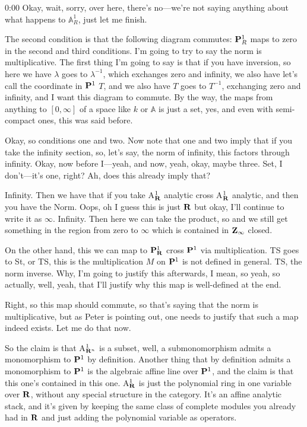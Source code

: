 \begin{unfinished}{0:00}
Okay, wait, sorry, over here, there's no---we're not saying anything about what happens to $\mathbb{A}^1_R$, just let me finish.

The second condition is that the following diagram commutes: $\P^1_R$ maps to zero in the second and third conditions. I'm going to try to say the norm is multiplicative. The first thing I'm going to say is that if you have inversion, so here we have $\lambda$ goes to $\lambda^{-1}$, which exchanges zero and infinity, we also have let's call the coordinate in $\P^1$ $T$, and we also have $T$ goes to $T^{-1}$, exchanging zero and infinity, and I want this diagram to commute. By the way, the maps from anything to $[0, \infty]$ of a space like $k$ or $\mathbb{A}$ is just a set, yes, and even with semi-compact ones, this was said before.

Okay, so conditions one and two. Now note that one and two imply that if you take the infinity section, so, let's say, the norm of infinity, this factors through infinity. Okay, now before I---yeah, and now, yeah, okay, maybe three. Set, I don't---it's one, right? Ah, does this already imply that?

Infinity. Then we have that if you take A$^1_\R$ analytic cross A$^1_\R$ analytic, and then you have the Norm. Oops, oh I guess this is just $\R$ but okay, I'll continue to write it as $\infty$. Infinity. Then here we can take the product, so and we still get something in the region from zero to $\infty$ which is contained in $\Z_{\infty}$ closed.

On the other hand, this we can map to $\P^1_\R$ cross $\P^1$ via multiplication. TS goes to St, or TS, this is the multiplication $M$ on $\P^1$ is not defined in general. TS, the norm inverse. Why, I'm going to justify this afterwards, I mean, so yeah, so actually, well, yeah, that I'll justify why this map is well-defined at the end.

Right, so this map should commute, so that's saying that the norm is multiplicative, but as Peter is pointing out, one needs to justify that such a map indeed exists. Let me do that now. 

So the claim is that A$^1_{\R^n}$ is a subset, well, a submonomorphism admits a monomorphism to $\P^1$ by definition. Another thing that by definition admits a monomorphism to $\P^1$ is the algebraic affine line over $\P^1$, and the claim is that this one's contained in this one. A$^1_\R$ is just the polynomial ring in one variable over $\R$, without any special structure in the category. It's an affine analytic stack, and it's given by keeping the same class of complete modules you already had in $\R$ and just adding the polynomial variable as operators.


\end{unfinished}
